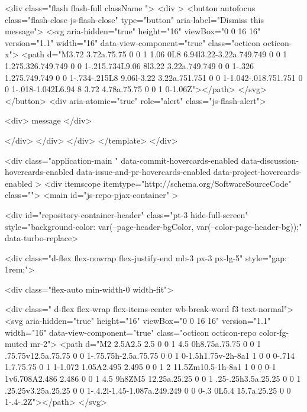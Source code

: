 <div class="flash flash-full   {{ className }}">
  <div >
    <button autofocus class="flash-close js-flash-close" type="button" aria-label="Dismiss this message">
      <svg aria-hidden="true" height="16" viewBox="0 0 16 16" version="1.1" width="16" data-view-component="true" class="octicon octicon-x">
    <path d="M3.72 3.72a.75.75 0 0 1 1.06 0L8 6.94l3.22-3.22a.749.749 0 0 1 1.275.326.749.749 0 0 1-.215.734L9.06 8l3.22 3.22a.749.749 0 0 1-.326 1.275.749.749 0 0 1-.734-.215L8 9.06l-3.22 3.22a.751.751 0 0 1-1.042-.018.751.751 0 0 1-.018-1.042L6.94 8 3.72 4.78a.75.75 0 0 1 0-1.06Z"></path>
</svg>
    </button>
    <div aria-atomic="true" role="alert" class="js-flash-alert">
      
      <div>{{ message }}</div>

    </div>
  </div>
</div>
  </template>
</div>


    






  <div
    class="application-main "
    data-commit-hovercards-enabled
    data-discussion-hovercards-enabled
    data-issue-and-pr-hovercards-enabled
    data-project-hovercards-enabled
  >
        <div itemscope itemtype="http://schema.org/SoftwareSourceCode" class="">
    <main id="js-repo-pjax-container" >
      
      
    

    






  
  <div id="repository-container-header"  class="pt-3 hide-full-screen" style="background-color: var(--page-header-bgColor, var(--color-page-header-bg));" data-turbo-replace>

      <div class="d-flex flex-nowrap flex-justify-end mb-3  px-3 px-lg-5" style="gap: 1rem;">

        <div class="flex-auto min-width-0 width-fit">
            
  <div class=" d-flex flex-wrap flex-items-center wb-break-word f3 text-normal">
      <svg aria-hidden="true" height="16" viewBox="0 0 16 16" version="1.1" width="16" data-view-component="true" class="octicon octicon-repo color-fg-muted mr-2">
    <path d="M2 2.5A2.5 2.5 0 0 1 4.5 0h8.75a.75.75 0 0 1 .75.75v12.5a.75.75 0 0 1-.75.75h-2.5a.75.75 0 0 1 0-1.5h1.75v-2h-8a1 1 0 0 0-.714 1.7.75.75 0 1 1-1.072 1.05A2.495 2.495 0 0 1 2 11.5Zm10.5-1h-8a1 1 0 0 0-1 1v6.708A2.486 2.486 0 0 1 4.5 9h8ZM5 12.25a.25.25 0 0 1 .25-.25h3.5a.25.25 0 0 1 .25.25v3.25a.25.25 0 0 1-.4.2l-1.45-1.087a.249.249 0 0 0-.3 0L5.4 15.7a.25.25 0 0 1-.4-.2Z"></path>
</svg>
    
